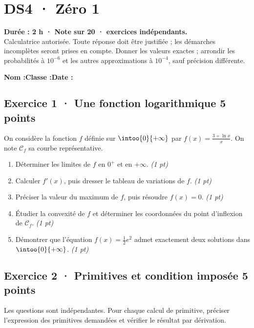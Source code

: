 \mxnewpage{}\label{sujet:6-1}

\section*{DS4 · Zéro 1}


\textbf{Durée : 2 h · Note sur 20 ·  exercices indépendants.}\\Calculatrice autorisée. Toute réponse doit être justifiée ; les démarches incomplètes seront prises en compte. Donner les valeurs exactes ; arrondir les probabilités à $10^{-6}$ et les autres approximations à $10^{-4}$, sauf précision différente.

\smallskip\textbf{Nom :}\enspace\dotfill\quad\textbf{Classe :}\enspace\dotfill\quad\textbf{Date :}\enspace\dotfill

\subsection*{Exercice 1 · Une fonction logarithmique \hfill 5 points}On considère la fonction $f$ définie sur $\intoo{0}{+\infty}$ par $f(x)=\frac{3+\ln x}x$. On note $\mathcal C_f$ sa courbe représentative.

\begin{enumerate}

\item Déterminer les limites de $f$ en $0^+$ et en $+\infty$. \hfill\textit{(1 pt)}

\item Calculer $f' (x)$, puis dresser le tableau de variations de $f$. \hfill\textit{(1 pt)}

\item Préciser la valeur du maximum de $f$, puis résoudre $f(x)=0$. \hfill\textit{(1 pt)}

\item Étudier la convexité de $f$ et déterminer les coordonnées du point d'inflexion de $\mathcal C_f$. \hfill\textit{(1 pt)}

\item Démontrer que l'équation $f(x)=\frac12 e^{2}$ admet exactement deux solutions dans $\intoo{0}{+\infty}$. \hfill\textit{(1 pt)}

\end{enumerate}

\subsection*{Exercice 2 · Primitives et condition imposée \hfill 5 points}Les  questions sont indépendantes. Pour chaque calcul de primitive, préciser l'expression des primitives demandées et vérifier le résultat par dérivation.

